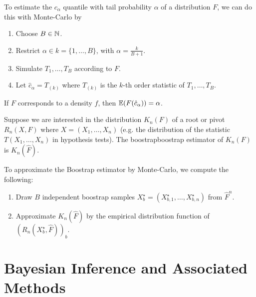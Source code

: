 \begin{defn}
  \label{sec:monte-carlo-method-11}
  To estimate the $c_{\alpha}$ quantile with tail probability $\alpha$
  of a distribution $F$, we can do this with Monte-Carlo by
  \begin{enumerate}
  \item Choose $B \in \mathbb{N}$.
  \item Restrict $\alpha \in k = \{ 1, \dots, B \} $, with $\alpha =
    \frac{k}{B+1} $.
  \item Simulate $T_{1}, \dots, T_{B}$ according to $F$.
  \item Let $\hat c_{\alpha} = T_{(k)}$ where $T_{(k)}$ is the $k$-th
    order statistic of $T_{1}, \dots, T_{B}$. 
  \end{enumerate}
\end{defn}

\begin{thm}
  \label{sec:monte-carlo-method-12}
  If $F$ corresponds to a density $f$, then $\E{F(\hat c_{\alpha})} = \alpha$.
\end{thm}

\begin{defn}
  \label{sec:monte-carlo-method-13}
  Suppose we are interested in the distribution $K_{n}(F)$ of a root
  or pivot $R_{n}(X, F)$ where $X  = (X_{1}, \dots, X_{n})$ (e.g. the
  distribution of the statistic $T(X_{1}, \dots, X_{n})$ in hypothesis
  tests).  The boostrapboostrap estimator of $K_{n}(F)$is $K_{n}(\hat F)$.
\end{defn}

\begin{defn}
  \label{sec:monte-carlo-method-14}
  To approximate the Boostrap estimator by Monte-Carlo, we compute the
  following:
  \begin{enumerate}
  \item Draw $B$ independent boostrap samples $X^{\star}_{b} = (X_{b,
      1}^{\star}, \dots, X_{b, n}^{\star})$ from $\hat F^{n}$.
  \item Approximate $K_{n}(\hat F)$ by the empirical distribution
    function of $(R_{n}(X^{\star}_{b}, \hat F))_{b}$.
  \end{enumerate}
\end{defn}

\section{Bayesian Inference and Associated Methods}
\label{sec:bayes-infer-assoc}

